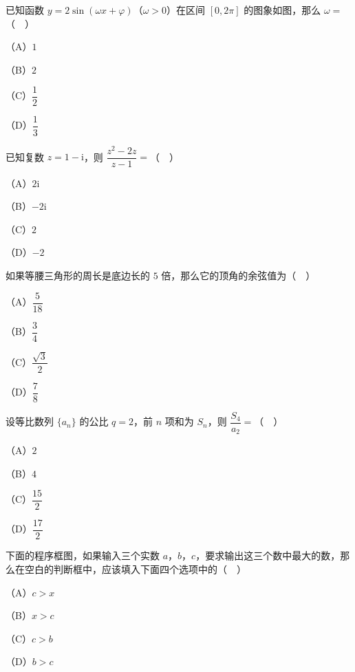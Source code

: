 


\Needspace{0.4\textheight}
\begin{question}
已知函数 $y=2\sin(\omega x+\varphi)$（$\omega>0$）在区间 $[0,2\pi]$ 的图象如图，那么 $\omega=$（　）

（A）$1$

（B）$2$

（C）$\dfrac12$

（D）$\dfrac13$
\nopagebreak[4]
\begin{center}\end{center}
\nopagebreak[4]
\end{question}
\begin{question}
已知复数 $z=1-\mathrm i$，则 $\dfrac{z^2-2z}{z-1}=$（　）

（A）$2\mathrm i$

（B）$-2\mathrm i$

（C）$2$

（D）$-2$

\end{question}
\begin{question}
如果等腰三角形的周长是底边长的 $5$ 倍，那么它的顶角的余弦值为（　）

（A）$\dfrac5{18}$

（B）$\dfrac34$

（C）$\dfrac{\sqrt3}2$

（D）$\dfrac78$

\end{question}
\begin{question}
设等比数列 $\{a_n\}$ 的公比 $q=2$，前 $n$ 项和为 $S_n$，则 $\dfrac{S_4}{a_2}=$（　）

（A）$2$

（B）$4$

（C）$\dfrac{15}2$

（D）$\dfrac{17}2$

\Needspace{0.4\textheight}
\end{question}
\begin{question}
下面的程序框图，如果输入三个实数 $a$，$b$，$c$，要求输出这三个数中最大的数，那么在空白的判断框中，应该填入下面四个选项中的（　）

（A）$c>x$

（B）$x>c$

（C）$c>b$

（D）$b>c$
\nopagebreak[4]
\begin{center}\end{center}
\nopagebreak[4]
\end{question}
